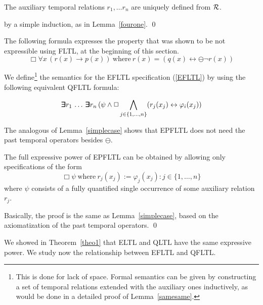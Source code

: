 \begin{lemma} \label{samesame}
The auxiliary temporal relations $r_1, \ldots r_n$ are
uniquely defined from ${\cal R}$.
\end{lemma}
 by a simple induction, as in Lemma~\ref{fourone}. \qed

The following formula expresses the property that was shown to be 
not expressible using FLTL, at the beginning of this section.
\begin{equation}
\Box \forall x \, (r(x)\rightarrow p(x)) \mathrm{\ where\ }
r(x) = ( q(x) \leftrightarrow \ominus \neg  r(x)) 
\label{eq:wolper-first-order}
\end{equation}

\noindent
We define\footnote{This is done for lack of space. Formal semantics 
can be given by constructing a set of temporal relations extended
with the auxiliary ones
inductively, as would be done in a detailed proof of Lemma~\ref{samesame}.} the semantics for the EFLTL 
specification (\ref{EFLTL}) 
by using the following equivalent
QFLTL formula:

\begin{equation} \label{equiv}
\bm{\exists}\kern-0.6em\bm{\exists} r_1  \, \ldots \, \bm{\exists}\kern-0.6em\bm{\exists} r_n \,  ( \psi \wedge \Box \bigwedge_{j \in \{ 1, \ldots , n\}} (r_j ( x_j )  \leftrightarrow 
\varphi_i ( x_j) )
\end{equation}

\noindent 
The analogous of Lemma~\ref{simplecase} shows that EPFLTL does not
need the past temporal operators besides $\ominus$.

\begin{lemma}
The full expressive power of EPFLTL can be obtained by allowing only 
specifications of the form
\[ \Box \psi \mathrm{\ where\ } r_j  ( x_j ) := 
\varphi_j (x_j) : j \in \{ 1 , \ldots , n \} \]
where $\psi$ consists of a fully quantified single occurrence of some
auxiliary relation $r_j$.
\end{lemma}


 Basically, the proof is the same as Lemma~\ref{simplecase}, based on the axiomatization of the
past temporal operators. \qed


We showed in Theorem~\ref{theo1} that ELTL
and QLTL have the same
expressive power. We study now the relationship between
EFLTL and QFLTL.

